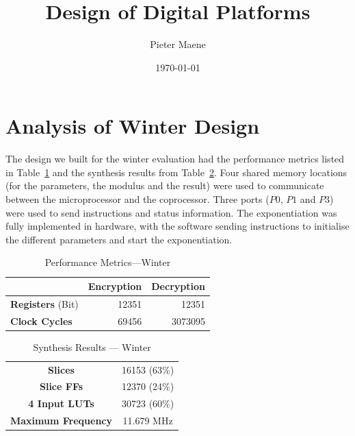 \documentclass[a4paper]{article}
\title{Design of Digital Platforms}
\author{Pieter Maene}
\date{\today}
\begin{document}
\maketitle

\section{Analysis of Winter Design}

The design we built for the winter evaluation had the performance metrics listed in Table~\ref{tab:performance_metrics_winter} and the synthesis results from Table~\ref{tab:synthesis_results_winter}. Four shared memory locations (for the parameters, the modulus and the result) were used to communicate between the microprocessor and the coprocessor. Three ports ($P0$, $P1$ and $P3$) were used to send instructions and status information. The exponentiation was fully implemented in hardware, with the software sending instructions to initialise the different parameters and start the exponentiation.\\

\begin{table}[H]
	\begin{center}	
		\begin{tabular}{l|r|r}
			 & \textbf{Encryption} & \textbf{Decryption}\\\hline
			\textbf{Registers} (Bit) & 12351 & 12351\\
		 	\textbf{Clock Cycles} & 69456 & 3073095\\
		\end{tabular}
	\end{center}
	\caption{Performance Metrics---Winter}
	\label{tab:performance_metrics_winter}
\end{table}

\begin{table}[H]
	\begin{center}	
		\begin{tabular}{c|c}
			\textbf{Slices} & 16153 (63\%)\\
			\textbf{Slice FFs} & 12370 (24\%)\\
			\textbf{4 Input LUTs} & 30723 (60\%)\\
			\textbf{Maximum Frequency} & 11.679 MHz
		\end{tabular}
	\end{center}
	\caption{Synthesis Results --- Winter}
	\label{tab:synthesis_results_winter}
\end{table}
\end{document}
